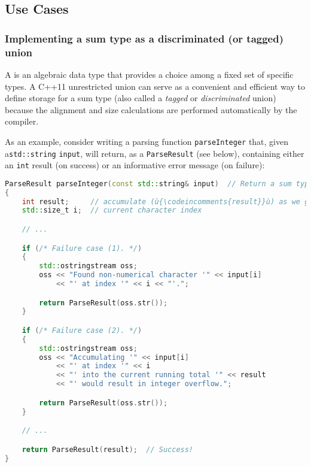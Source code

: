 \subsection[Use Cases]{Use Cases}\label{unrestrictedunion-use-cases}

\subsubsection[Implementing a \romeogloss{sum type} as a discriminated (or tagged) {\tt union}]{Implementing a sum type as a discriminated (or tagged) {\SubsubsecCode union}}\label{implementing-a-sum-type-as-a-discriminating-(or-tagged)-union}

A  is an algebraic data type that provides a choice
among a fixed set of specific types. A C++11 unrestricted union can serve as a convenient and efficient way to define storage for a sum type (also called a \emph{tagged} or \emph{discriminated} union) because the alignment and size calculations are performed automatically by the compiler.

As an example, consider writing a parsing function \lstinline!parseInteger!
that, given a\linebreak[4] \lstinline!std::string! \lstinline!input!, will return, as a
 \lstinline!ParseResult! (see below), containing either an
\lstinline!int! result (on success) or an informative error message
(on failure):

\begin{lstlisting}[language=C++]
ParseResult parseInteger(const std::string& input)  // Return a sum type.
{
    int result;     // accumulate (ù{\codeincomments{result}}ù) as we go
    std::size_t i;  // current character index

    // ...

    if (/* Failure case (1). */)
    {
        std::ostringstream oss;
        oss << "Found non-numerical character '" << input[i]
            << "' at index '" << i << "'.";

        return ParseResult(oss.str());
    }

    if (/* Failure case (2). */)
    {
        std::ostringstream oss;
        oss << "Accumulating '" << input[i]
            << "' at index '" << i
            << "' into the current running total '" << result
            << "' would result in integer overflow.";

        return ParseResult(oss.str());
    }

    // ...

    return ParseResult(result);  // Success!
}
\end{lstlisting}
    

